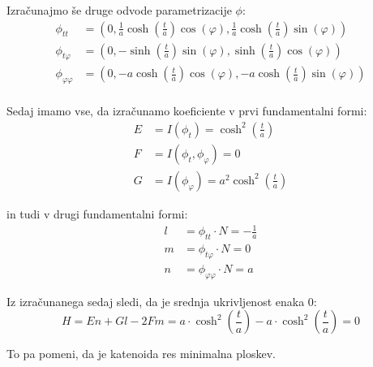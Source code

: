 \documentclass[mat1]{fmfdelo}
\begin{document}
\begin{primer}[Katenoida]
    Izračunajmo še druge odvode parametrizacije $\phi$:
    \begin{align*}
        \phi_{tt} &= \left( 0, \frac{1}{a} \cosh\left( \frac{t}{a} \right) \cos\left(\varphi\right) , \frac{1}{a} \cosh\left( \frac{t}{a} \right) \sin\left(\varphi\right) \right) \\
        \phi_{t\varphi} &= \left( 0, - \sinh\left( \frac{t}{a} \right) \sin\left(\varphi\right) , \sinh\left( \frac{t}{a} \right) \cos\left(\varphi\right) \right) \\
        \phi_{\varphi\varphi} &= \left( 0, - a \cosh\left( \frac{t}{a} \right) \cos\left(\varphi\right) , - a \cosh\left( \frac{t}{a} \right) \sin\left(\varphi\right) \right) \\
    \end{align*}

    Sedaj imamo vse, da izračunamo koeficiente v prvi fundamentalni formi:
    \begin{align*}
        E &= I(\phi_t) = \cosh^2 \left( \frac{t}{a} \right) \\
        F &= I(\phi_t, \phi_{\varphi}) = 0 \\
        G &= I(\phi_{\varphi}) = a^2 \cosh^2 \left( \frac{t}{a} \right)
    \end{align*}

    in tudi v drugi fundamentalni formi:
    \begin{align*}
        l &= \phi_{tt} \cdot N = - \frac{1}{a} \\
        m &= \phi_{t\varphi} \cdot N = 0 \\
        n &= \phi_{\varphi\varphi} \cdot N = a
    \end{align*}

    Iz izračunanega sedaj sledi, da je srednja ukrivljenost enaka $0$:
    $$ H = En + Gl - 2Fm = a \cdot \cosh^2 \left( \frac{t}{a} \right) - a \cdot \cosh^2 \left( \frac{t}{a} \right) = 0$$

    To pa pomeni, da je katenoida res minimalna ploskev.
\end{primer}
\end{document}
